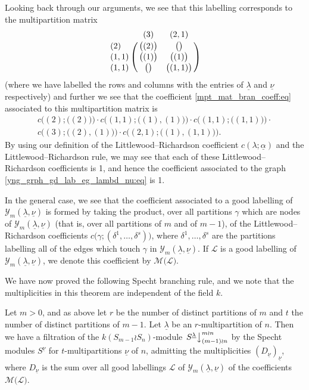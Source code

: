 \documentclass[ALCO,Unicode,published]{cedram}
\newcommand{\ul}[1]{\underline{#1}}
\begin{document}
Looking back through our arguments, we see that this labelling corresponds to the multipartition matrix
\[
\bordermatrix{
      & (3)             &(2,1)              \cr
(2)   & \bigl((2)\bigr) & \bigl(\bigr)      \cr
(1,1) & \bigl((1)\bigr) & \bigl((1)\bigr)   \cr
(1,1) & \bigl(\bigr)    & \bigl((1,1)\bigr)
}
\]
(where we have labelled the rows and columns with the entries of $\ul{\lambda}$ and $\ul{\nu}$ respectively)
and further we see that the coefficient \eqref{mpt_mat_bran_coeff:eq} associated to this multipartition matrix is
\begin{multline*}
c\bigl((2);\bigl((2)\bigr)\bigr)\cdot c\bigl((1,1);\bigl((1),(1)\bigr)\bigr)\cdot c\bigl((1,1);\bigl((1,1)\bigr)\bigr)\cdot\\
c\bigl((3);\bigl((2),(1)\bigr)\bigr)\cdot c\bigl((2,1);\bigl((1),(1,1)\bigr)\bigr).
\end{multline*}
By using our definition of the Littlewood--Richardson coefficient $c(\lambda;\ul{\alpha})$ and the Littlewood--Richardson rule, we may see
that each of these Littlewood--Richardson coefficients is 1, and hence the coefficient
associated to the graph \eqref{yng_grph_gd_lab_eg_lambd_nu:eq} is 1.

In the general case, we see that the coefficient associated to a good labelling of $\mathcal{Y}_m(\ul{\lambda},\ul{\nu})$ is formed by
taking the product, over all partitions $\gamma$ which are nodes of $\mathcal{Y}_m(\ul{\lambda},\ul{\nu})$ (that is, over all partitions
of $m$ and of $m-1$), of the Littlewood--Richardson coefficients $c\bigl(\gamma;(\delta^1,\ldots,\delta^s)\bigr)$, where
$\delta^1,\ldots,\delta^s$ are the partitions
labelling all of the edges which touch $\gamma$ in $\mathcal{Y}_m(\ul{\lambda},\ul{\nu})$. If $\mathcal{L}$ is a good labelling of
$\mathcal{Y}_m(\ul{\lambda},\ul{\nu})$, we denote this coefficient by $\mathcal{M}\bigl(\mathcal{L}\bigr)$.

We have now proved the following Specht branching rule, and we note that the multiplicities in this theorem are independent of the field
$k$.

\begin{theo}\label{wr_branching_one:thm}
Let $m>0$, and as above let $r$ be the number of distinct partitions of $m$ and $t$ the number of distinct partitions of $m-1$.
Let $\ul{\lambda}$ be an $r$-multipartition of $n$. Then we have a filtration of the $k(S_{m-1} \wr S_n)$-module
$\left.S^{\ul{\lambda}}\right\downarrow^{m \wr n}_{(m-1) \wr n}$ by the Specht modules $S^{\ul{\nu}}$ for $t$-multipartitions $\ul{\nu}$ of $n$,
admitting the multiplicities $(D_{\ul{\nu}})_{\ul{\nu}}$,  where $D_{\ul{\nu}}$  is the sum over all good labellings $\mathcal{L}$ of
$\mathcal{Y}_m(\ul{\lambda},\ul{\nu})$ of the coefficients $\mathcal{M}\bigl(\mathcal{L}\bigr)$.
\end{theo}
\end{document}
